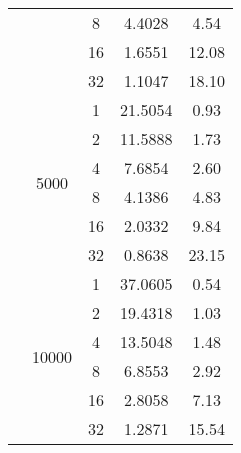 \begin{tabularx}{\textwidth}{@{} c c c c c @{}}
                            &                       & 8  & 4.4028  & 4.54  \\
                            &                       & 16 & 1.6551  & 12.08 \\
                            &                       & 32 & 1.1047  & 18.10 \\
                            \cmidrule{2-5}
                            & \multirow{6}{*}{5000} & 1  & 21.5054 & 0.93  \\
                            &                       & 2  & 11.5888 & 1.73  \\
                            &                       & 4  & 7.6854  & 2.60  \\
                            &                       & 8  & 4.1386  & 4.83  \\
                            &                       & 16 & 2.0332  & 9.84  \\
                            &                       & 32 & 0.8638  & 23.15 \\
                            \cmidrule{2-5}
                            & \multirow{6}{*}{10000} & 1  & 37.0605 & 0.54  \\
                            &                        & 2  & 19.4318 & 1.03  \\
                            &                        & 4  & 13.5048 & 1.48  \\
                            &                        & 8  & 6.8553  & 2.92  \\
                            &                        & 16 & 2.8058  & 7.13  \\
                            &                        & 32 & 1.2871  & 15.54 \\
\bottomrule
\end{tabularx}

